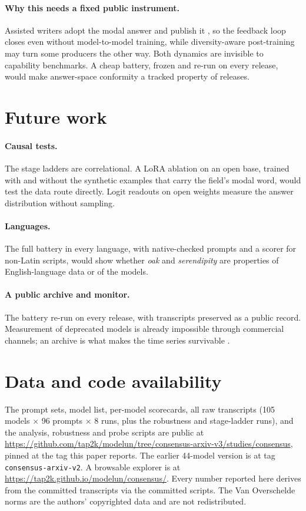 \documentclass[11pt]{article}
\begin{document}
\paragraph{Why this needs a fixed public instrument.}
Assisted writers adopt the modal answer and publish it \citep{doshi2024generative,padmakumar2024writing,anderson2024homogenization}, so the feedback loop closes even without model-to-model training, while diversity-aware post-training \citep{li2025darling} may turn some producers the other way. Both dynamics are invisible to capability benchmarks. A cheap battery, frozen and re-run on every release, would make answer-space conformity a tracked property of releases.

\section{Future work}
\label{sec:future}

\paragraph{Causal tests.} The stage ladders are correlational. A LoRA ablation on an open base, trained with and without the synthetic examples that carry the field's modal word, would test the data route directly. Logit readouts on open weights measure the answer distribution without sampling.

\paragraph{Languages.} The full battery in every language, with native-checked prompts and a scorer for non-Latin scripts, would show whether \emph{oak} and \emph{serendipity} are properties of English-language data or of the models.

\paragraph{A public archive and monitor.} The battery re-run on every release, with transcripts preserved as a public record. Measurement of deprecated models is already impossible through commercial channels; an archive is what makes the time series survivable \citep{johnson2024deprecating}.

\section*{Data and code availability}
\sloppy
The prompt sets, model list, per-model scorecards, all raw transcripts (105 models $\times$ 96 prompts $\times$ 8 runs, plus the robustness and stage-ladder runs), and the analysis, robustness and probe scripts are public at \url{https://github.com/tap2k/modelun/tree/consensus-arxiv-v3/studies/consensus}, pinned at the tag this paper reports. The earlier 44-model version is at tag \texttt{consensus-arxiv-v2}. A browsable explorer is at \url{https://tap2k.github.io/modelun/consensus/}. Every number reported here derives from the committed transcripts via the committed scripts. The Van Overschelde norms are the authors' copyrighted data and are not redistributed.
\end{document}
